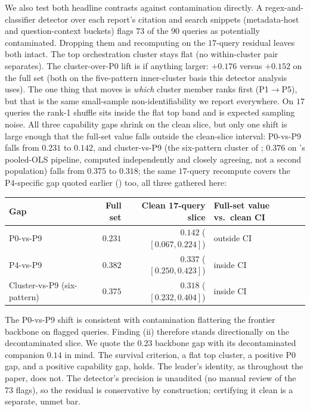 \documentclass[11pt]{article}
\begin{document}
We also test both headline contrasts against contamination directly. A
regex-and-classifier detector over each report's citation and search snippets (metadata-host and
question-context buckets) flags $73$ of the $90$ queries as potentially contaminated. Dropping them
and recomputing on the $17$-query residual leaves both intact. The top orchestration
cluster stays flat (no within-cluster pair separates). The cluster-over-P0 lift is if anything
larger: $+0.176$ versus $+0.152$ on the full set (both on the five-pattern inner-cluster
basis this detector analysis uses). The one thing that moves is \emph{which}
cluster member ranks first (P1$\to$P5), but that is the same small-sample non-identifiability we
report everywhere. On $17$ queries the rank-1 shuffle sits inside the flat top band and is
expected sampling noise. All three capability gaps shrink on the clean slice, but only one
shift is large enough that the full-set value falls outside the clean-slice interval:
P0-vs-P9 falls from $0.231$ to $0.142$, and cluster-vs-P9 (the six-pattern cluster of
; $0.376$ on 's pooled-OLS pipeline, computed
independently and closely agreeing, not a second population) falls from $0.375$ to
$0.318$; the same $17$-query recompute covers the P4-specific gap quoted earlier
() too, all three gathered here:
\begin{center}
\small
\begin{tabular}{lrrl}
\toprule
Gap & Full set & Clean 17-query slice & Full-set value vs.\ clean CI \\
\midrule
P0-vs-P9 & $0.231$ & $0.142$ ($[0.067, 0.224]$) & outside CI \\
P4-vs-P9 & $0.382$ & $0.337$ ($[0.250, 0.423]$) & inside CI \\
Cluster-vs-P9 (six-pattern) & $0.375$ & $0.318$ ($[0.232, 0.404]$) & inside CI \\
\bottomrule
\end{tabular}
\end{center}
The P0-vs-P9 shift is consistent with contamination flattering the frontier backbone on
flagged queries. Finding (ii) therefore stands directionally on the decontaminated slice. We quote the
$0.23$ backbone gap with its decontaminated companion $0.14$ in mind. The survival
criterion, a flat top cluster, a positive P0 gap, and a positive capability gap, holds.
The leader's identity, as throughout the paper, does not. The detector's precision is
unaudited (no manual review of the $73$ flags), so the residual is conservative by
construction; certifying it clean is a separate, unmet bar.
\end{document}
